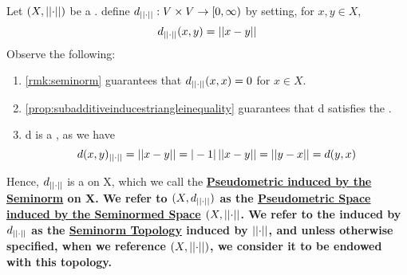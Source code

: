 \label{def:seminormtopology}
\newcommand{\SeminormTopology}[0]{
    \bf \hyperref[def:seminormtopology]{Seminorm Topology} \rm
}

\newcommand{\SeminormInducedPseudometric}[0]{
    \bf \hyperref[def:seminormtopology]{Pseudometric induced by the Seminorm} \rm
}

\newcommand{\SeminormSpaceInducedPseudometricSpace}[0]{
    \bf \hyperref[def:seminormtopology]{Pseudometric Space induced by the Seminormed Space} \rm
}


\begin{df}
    Let $(X,\left|\left| \cdot \right|\right|)$ be a \SeminormedSpace.
    define $d_{\left|\left| \cdot \right|\right|}:V \times V \to [0,\infty)$  by setting,
    for $x,y \in X$, 
    \begin{equation}
    d_{\left|\left| \cdot \right|\right|}(x,y) = \left|\left| x-y \right|\right|
    \end{equation}
    Observe the following: 
    \begin{enumerate}
        \item \ref{rmk:seminorm} guarantees that $d_{\left|\left| \cdot \right|\right|}(x,x)=0$ for $x \in X$. 
        \item 
        \ref{prop:subadditiveinducestriangleinequality} guarantees that d satisfies the \TriangleInequality. 
        \item d is a \SymmetricMap, as we have 
    \begin{equation}
        d(x,y)_{\left|\left| \cdot \right|\right|}=\left|\left| x-y \right|\right|=|-1|\left|\left| x-y \right|\right|=\left|\left| y-x \right|\right|=d(y,x)
    \end{equation}
    \end{enumerate}

    Hence, $d_{\left|\left| \cdot \right|\right|}$  is a \Pseudometric on X, which we call the \SeminormInducedPseudometric on X. 
    We refer to $(X, d_{\left|\left| \cdot \right|\right|})$ as the \SeminormSpaceInducedPseudometricSpace $(X,\left|\left| \cdot \right|\right|$. 
    We refer to the \PseudometricTopology induced by $d_{\left|\left| \cdot \right|\right|}$ as the \SeminormTopology induced by $\left|\left| \cdot \right|\right|$, and unless otherwise specified, when we reference $(X,\left|\left| \cdot \right|\right|)$, we consider it to be endowed with this topology. 

\end{df}
